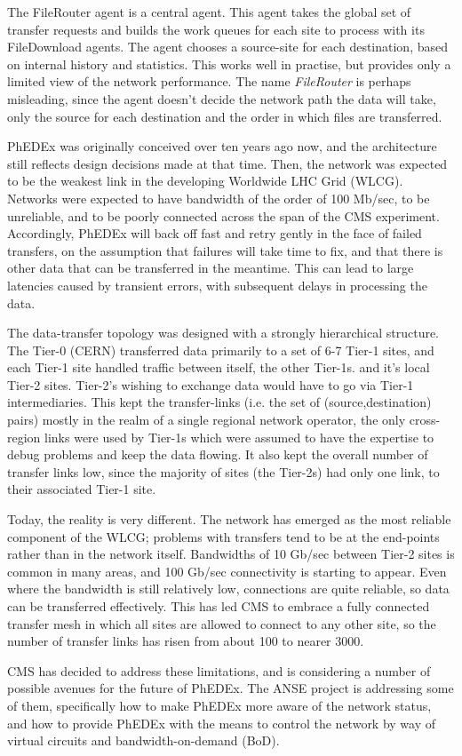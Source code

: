 The FileRouter agent is a central agent. This agent takes the global set of transfer requests and builds the work queues for each site to process with its FileDownload agents. The agent chooses a source-site for each destination, based on internal history and statistics. This works well in practise, but provides only a limited view of the network performance. The name \emph{FileRouter} is perhaps misleading, since the agent doesn't decide the network path the data will take, only the source for each destination and the order in which files are transferred.

PhEDEx was originally conceived over ten years ago now, and the architecture still reflects design decisions made at that time. Then, the network was expected to be the weakest link in the developing Worldwide LHC Grid (WLCG)\cite{WLCG}. Networks were expected to have bandwidth of the order of 100 Mb/sec, to be unreliable, and to be poorly connected across the span of the CMS experiment. Accordingly, PhEDEx will back off fast and retry gently in the face of failed transfers, on the assumption that failures will take time to fix, and that there is other data that can be transferred in the meantime. This can lead to large latencies caused by transient errors, with subsequent delays in processing the data.

The data-transfer topology was designed with a strongly hierarchical structure. The Tier-0 (CERN) transferred data primarily to a set of 6-7 Tier-1 sites, and each Tier-1 site handled traffic between itself, the other Tier-1s. and it's local Tier-2 sites. Tier-2's wishing to exchange data would have to go via Tier-1 intermediaries. This kept the transfer-links (i.e. the set of (source,destination) pairs) mostly in the realm of a single regional network operator, the only cross-region links were used by Tier-1s which were assumed to have the expertise to debug problems and keep the data flowing. It also kept the overall number of transfer links low, since the majority of sites (the Tier-2s) had only one link, to their associated Tier-1 site.

Today, the reality is very different. The network has emerged as the most reliable component of the WLCG; problems with transfers tend to be at the end-points rather than in the network itself. Bandwidths of 10 Gb/sec between Tier-2 sites is common in many areas, and 100 Gb/sec connectivity is starting to appear. Even where the bandwidth is still relatively low, connections are quite reliable, so data can be transferred effectively. This has led CMS to embrace a fully connected transfer mesh in which all sites are allowed to connect to any other site, so the number of transfer links has risen from about 100 to nearer 3000.

CMS has decided to address these limitations, and is considering a number of possible avenues for the future of PhEDEx\cite{TW_DB_CHEP13}. The ANSE\cite{ANSE} project is addressing some of them, specifically how to make PhEDEx more aware of the network status, and how to provide PhEDEx with the means to control the network by way of virtual circuits and bandwidth-on-demand (BoD).